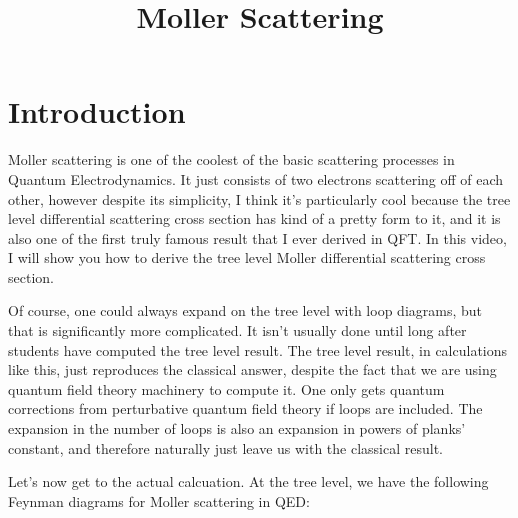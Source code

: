 \documentclass[a4]{article}
\begin{document}
    \title{Moller Scattering}
    \maketitle

    \section*{Introduction}

    Moller scattering is one of the coolest of the basic scattering processes in Quantum Electrodynamics. It just consists of two electrons scattering off of each other, however despite its simplicity,
    I think it's particularly cool because the tree level differential scattering cross section has kind of a pretty form to it, and it is also one of the first truly famous result that I ever derived
    in QFT. In this video, I will show you how to derive the tree level Moller differential scattering cross section.

    Of course, one could always expand on the tree level with loop diagrams, but that is significantly more complicated. It isn't usually done until long after students have computed the tree level result.
    The tree level result, in calculations like this, just reproduces the classical answer, despite the fact that we are using quantum field theory machinery to compute it. One only gets quantum corrections
    from perturbative quantum field theory if loops are included. The expansion in the number of loops is also an expansion in powers of planks' constant, and therefore naturally just leave us with the
    classical result.

    Let's now get to the actual calcuation. At the tree level, we have the following Feynman diagrams for Moller scattering in QED:
\end{document}
